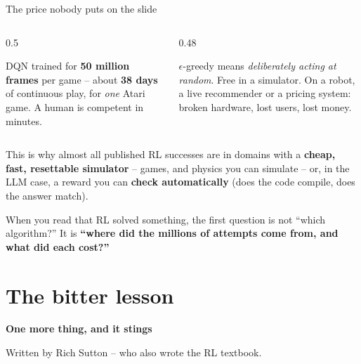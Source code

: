 \documentclass[aspectratio=169]{beamer}
\begin{document}
\begin{frame}{The price nobody puts on the slide}
  \begin{columns}[T]
    \begin{column}{0.5\textwidth}
      \begin{tcolorbox}[colback=armred!8, colframe=armred, boxrule=0.6pt, arc=2pt,
                        title=\textbf{It is astonishingly data-hungry}]
        \footnotesize
        DQN trained for \textbf{50 million frames} per game -- about \textbf{38 days} of
        continuous play, for \emph{one} Atari game. A human is competent in minutes.
      \end{tcolorbox}
    \end{column}
    \begin{column}{0.48\textwidth}
      \begin{tcolorbox}[colback=armorange!12, colframe=armorange, boxrule=0.6pt, arc=2pt,
                        title=\textbf{Exploration costs in the real world}]
        \footnotesize
        $\epsilon$-greedy means \emph{deliberately acting at random}. Free in a simulator. On a
        robot, a live recommender or a pricing system: broken hardware, lost users, lost money.
      \end{tcolorbox}
    \end{column}
  \end{columns}

  \vskip 6pt
  \footnotesize
  This is why almost all published RL successes are in domains with a \textbf{cheap, fast,
  resettable simulator} -- games, and physics you can simulate -- or, in the LLM case, a
  reward you can \textbf{check automatically} (does the code compile, does the answer match).

  \vskip 5pt
  \begin{tcolorbox}[colback=armblue!8, colframe=armblue, boxrule=0.6pt, arc=2pt]
    \footnotesize
    When you read that RL solved something, the first question is not ``which algorithm?''
    It is \textbf{``where did the millions of attempts come from, and what did each cost?''}
  \end{tcolorbox}
\end{frame}

\section{The bitter lesson}
\begin{frame}[plain]
  \begin{center}
    \vskip 1.6cm
    {\Huge\bfseries\color{popblue}One more thing, and it stings}

    \vskip 0.6cm
    {\large Written by Rich Sutton -- who also wrote the RL textbook.}
  \end{center}
\end{frame}
\end{document}
